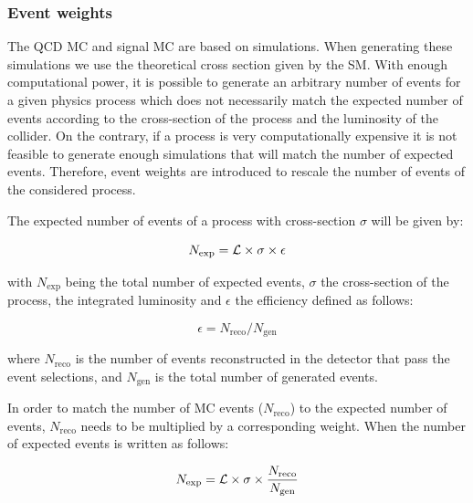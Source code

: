 
\subsubsection{Event weights}

The QCD MC and signal MC are based on simulations. When generating these simulations we use the theoretical cross section given by the SM. With enough computational power, it is possible to generate an arbitrary number of events for a given physics process which does not necessarily match the expected number of events according to the cross-section of the process and the luminosity of the collider. On the contrary, if a process is very computationally expensive it is not feasible to generate enough simulations that will match the number of expected events. Therefore, event weights are introduced to rescale the number of events of the considered process.

The expected number of events of a process with cross-section $\sigma$ will be given by:

\begin{equation}
    N_{\text{exp}} = {\mathcal{L}} \times \sigma \times \epsilon
\end{equation}

\noindent with $N_{\text{exp}}$ being the total number of expected events, $\sigma$ the cross-section of the process, \lumi the integrated luminosity and $\epsilon$ the efficiency defined as follows:


\begin{equation}
    \epsilon= N_{\text{reco}} / N_{\text{gen}}
\end{equation}

\noindent where $N_{\text{reco}}$ is the number of events reconstructed in the detector that pass the event selections, and $N_{\text{gen}}$ is the total number of generated events.

In order to match the number of MC events ($N_{\text{reco}}$) to the expected number of events, $N_{\text{reco}}$ needs to be multiplied by a corresponding weight. When the number of expected events is written as follows:

\begin{equation}
    N_{\text{exp}} = {\mathcal{L}} \times \sigma \times \frac{N_{\text{reco}}}{N_{\text{gen}}}
\end{equation}

